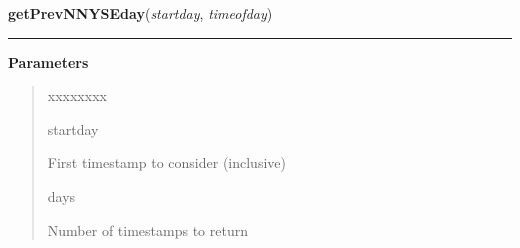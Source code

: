 \hspace{.8\funcindent}\begin{boxedminipage}{\funcwidth}

    \raggedright \textbf{getPrevNNYSEday}(\textit{startday}, \textit{timeofday})

    \vspace{-1.5ex}

    \rule{\textwidth}{0.5\fboxrule}
\setlength{\parskip}{2ex}
\setlength{\parskip}{1ex}
      \textbf{Parameters}
      \vspace{-1ex}

      \begin{quote}
        \begin{Ventry}{xxxxxxxx}

          \item[startday]

          First timestamp to consider (inclusive)

          \item[days]

          Number of timestamps to return

        \end{Ventry}

      \end{quote}

    \end{boxedminipage}

    \label{QSTK:qstkutil:dateutil:ymd2epoch}

    \vspace{0.5ex}

